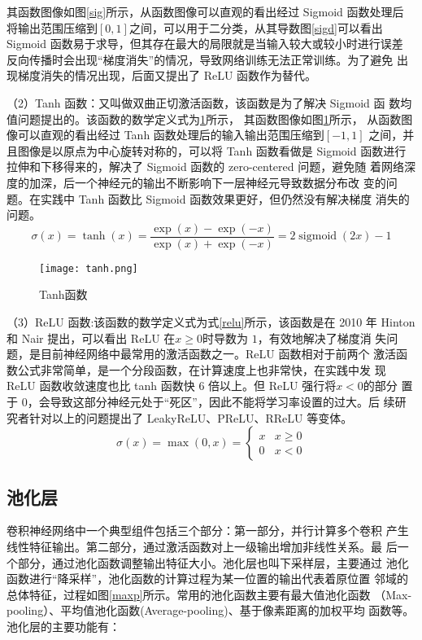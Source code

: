 其函数图像如图\ref{sig}所示，从函数图像可以直观的看出经过 Sigmoid 函数处理后
将输出范围压缩到$[0,1]$之间，可以用于二分类，从其导数图\ref{sigd}可以看出
Sigmoid 函数易于求导，但其存在最大的局限就是当输入较大或较小时进行误差
反向传播时会出现“梯度消失”的情况，导致网络训练无法正常训练。为了避免
出现梯度消失的情况出现，后面又提出了 ReLU 函数作为替代。

（2）Tanh 函数：又叫做双曲正切激活函数，该函数是为了解决 Sigmoid 函
数均值问题提出的。该函数的数学定义式为\ref{tanh}所示，
其函数图像如图\ref{tanh}所示，
从函数图像可以直观的看出经过 Tanh 函数处理后的输入输出范围压缩到$[-1,1]$
之间，并且图像是以原点为中心旋转对称的，可以将 Tanh 函数看做是 Sigmoid
函数进行拉伸和下移得来的，解决了 Sigmoid 函数的 zero-centered 问题，避免随
着网络深度的加深，后一个神经元的输出不断影响下一层神经元导致数据分布改
变的问题。在实践中 Tanh 函数比 Sigmoid 函数效果更好，但仍然没有解决梯度
消失的问题。
\begin{equation}
    \sigma(x)=\tanh (x)=\frac{\exp (x)-\exp (-x)}{\exp (x)+\exp (-x)}=2 \operatorname{sigmoid}(2 x)-1
    \label{tan}
\end{equation}

\begin{figure}[htbp]
    \centering
    \texttt{[image: tanh.png]}
    \caption{Tanh函数}
    \label{tanh}
\end{figure}

（3）ReLU 函数:该函数的数学定义式为式\ref{relu}所示，该函数是在 2010 年
Hinton 和 Nair 提出，可以看出 ReLU 在$x\ge 0$时导数为 $1$，有效地解决了梯度消
失问题，是目前神经网络中最常用的激活函数之一\cite{xu2015empirical}。ReLU 函数相对于前两个
激活函数公式非常简单，是一个分段函数，在计算速度上也非常快，在实践中发
现 ReLU 函数收敛速度也比 tanh 函数快 6 倍以上。但 ReLU 强行将$ x<0$的部分
置于 0，会导致这部分神经元处于“死区”，因此不能将学习率设置的过大。后
续研究者针对以上的问题提出了 LeakyReLU\cite{maas2013rectifier}、PReLU、RReLU 等变体。
\begin{equation}
    \sigma(x)=\max (0, x)= \begin{cases}x & x \geq 0 \\ 0 & x<0\end{cases}
    \label{relu}
\end{equation}

\subsection{池化层}
卷积神经网络中一个典型组件包括三个部分：第一部分，并行计算多个卷积
产生线性特征输出。第二部分，通过激活函数对上一级输出增加非线性关系。最
后一个部分，通过池化函数调整输出特征大小。池化层也叫下采样层，主要通过
池化函数进行“降采样”，池化函数的计算过程为某一位置的输出代表着原位置
邻域的总体特征，过程如图\ref{maxp}所示。常用的池化函数主要有最大值池化函数
（Max-pooling）、平均值池化函数(Average-pooling)、基于像素距离的加权平均
函数等。池化层的主要功能有：

